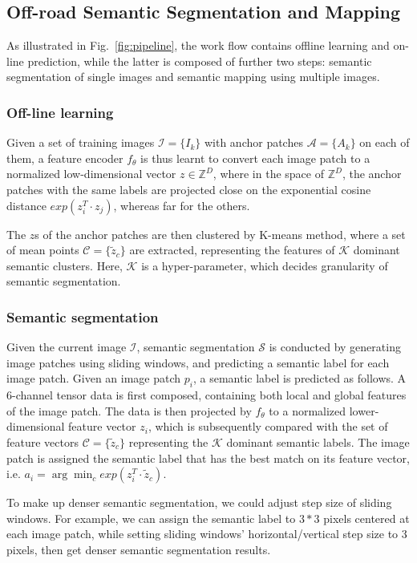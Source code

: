 \documentclass[letterpaper, 10 pt, conference]{ieeeconf}  %
\begin{document}
\subsection{Off-road Semantic Segmentation and Mapping}

As illustrated in Fig.~\ref{fig:pipeline}, the work flow contains offline learning and on-line prediction, while the latter is composed of further two steps: semantic segmentation of single images and semantic mapping using multiple images.

\subsubsection{Off-line learning}
Given a set of training images $\mathcal{I}=\{I_k\}$ with anchor patches $\mathcal{A}=\{A_k\}$ on each of them, a feature encoder $f_\theta$ is thus learnt to convert each image patch to a normalized low-dimensional vector $z\in \mathbb{Z}^D$, where in the space of $\mathbb{Z}^D$, the anchor patches with the same labels are projected close on the exponential cosine distance $exp(z_i^T \cdot z_j)$, whereas far for the others.

The $z$s of the anchor patches are then clustered by K-means method, where a set of mean points $\mathcal{C}=\{\tilde{z}_c\}$ are extracted, representing the features of $\mathcal{K}$ dominant semantic clusters. Here, $\mathcal{K}$ is a hyper-parameter, which decides granularity of semantic segmentation.

\subsubsection{Semantic segmentation}

Given the current image $\mathcal{I}$, semantic segmentation $\mathcal{S}$ is conducted by generating image patches using sliding windows, and predicting a semantic label for each image patch.
Given an image patch $p_i$, a semantic label is predicted as follows. A 6-channel tensor data is first composed, containing both local and global features of the image patch. The data is then projected by $f_{\theta}$ to a normalized lower-dimensional feature vector $z_i$, which is subsequently compared with the set of feature vectors $\mathcal{C}=\{\tilde{z}_c\}$ representing the $\mathcal{K}$ dominant semantic labels. The image patch is assigned the semantic label that has the best match on its feature vector, i.e. $a_i = \arg\min_c exp(z_i^T \cdot \tilde{z}_c)$.

To make up denser semantic segmentation, we could adjust step size of sliding windows. For example, we can assign the semantic label to $3*3$ pixels centered at each image patch, while setting sliding windows' horizontal/vertical step size to 3 pixels, then get denser semantic segmentation results.
\end{document}
